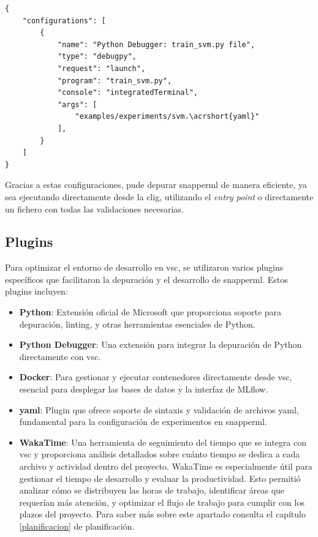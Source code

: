 \begin{verbatim}
{
    "configurations": [
        {
            "name": "Python Debugger: train_svm.py file",
            "type": "debugpy",
            "request": "launch",
            "program": "train_svm.py",
            "console": "integratedTerminal",
            "args": [
                "examples/experiments/svm.\acrshort{yaml}"
            ],
        }
    ]
}
\end{verbatim}

Gracias a estas configuraciones, pude depurar \Gls{snapperml} de manera eficiente, ya sea ejecutando directamente desde la \Gls{clig}, utilizando el \textit{entry point} o directamente un fichero con todas las validaciones necesarias.

\subsection{Plugins}

Para optimizar el entorno de desarrollo en \acrlong{vsc}, se utilizaron varios plugins específicos que facilitaron la depuración y el desarrollo de \Gls{snapperml}. Estos plugins incluyen:

\begin{itemize}
    \item \textbf{Python}: Extensión oficial de Microsoft que proporciona soporte para depuración, linting, y otras herramientas esenciales de Python.
    \item \textbf{Python Debugger}: Una extensión para integrar la depuración de Python directamente con \acrlong{vsc}.
    \item \textbf{Docker}: Para gestionar y ejecutar contenedores directamente desde \acrshort{vsc}, esencial para desplegar las bases de datos y la interfaz de MLflow.
    \item \textbf{\acrshort{yaml}}: Plugin que ofrece soporte de sintaxis y validación de archivos \acrshort{yaml}, fundamental para la configuración de experimentos en \Gls{snapperml}.
    \item \textbf{WakaTime}: Una herramienta de seguimiento del tiempo que se integra con \acrshort{vsc} y proporciona análisis detallados sobre cuánto tiempo se dedica a cada archivo y actividad dentro del proyecto. WakaTime es especialmente útil para gestionar el tiempo de desarrollo y evaluar la productividad. Esto permitió analizar cómo se distribuyen las horas de trabajo, identificar áreas que requerían más atención, y optimizar el flujo de trabajo para cumplir con los plazos del proyecto. Para saber más sobre este apartado consulta el capítulo \ref{planificacion} de planificación.
\end{itemize}

